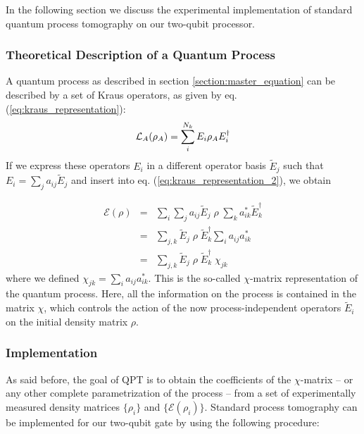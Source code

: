 \smallskip

In the following section we discuss the experimental implementation of standard quantum process tomography on our two-qubit processor.

\subsubsection{Theoretical Description of a Quantum Process}

A quantum process as described in section \ref{section:master_equation} can be described by a set of Kraus operators, as given by eq. (\ref{eq:kraus_representation}):
%
\begin{equation}
\LA{A}(\rho_A) = \sum\limits_i^{N_k} E_i \rho_A E_i^\dagger \label{eq:kraus_representation_2}
\end{equation}
%
If we express these operators $E_i$ in a different operator basis $\tilde{E}_j$ such that $E_i = \sum_j a_{ij} \tilde{E}_{j}$ and insert into eq. (\ref{eq:kraus_representation_2}), we obtain

\begin{eqnarray}
 \mathcal{E}(\rho) & = & \sum\limits_i \sum\limits_j a_{ij} \tilde{E}_j \;\rho\; \sum\limits_k a_{ik}^* \tilde{E}_k^\dagger \\
& = & \sum\limits_{j,k}\tilde{E}_j \; \rho \; \tilde{E}_k^\dagger \sum\limits_i a_{ij} a_{ik}^* \\
& = & \sum\limits_{j,k}\tilde{E}_j \; \rho \; \tilde{E}_k^\dagger \; \chi_{jk} \label{eq:process_chi_representation}
\end{eqnarray}
where we defined $\chi_{jk} = \sum\limits_i a_{ij} a_{ik}^*$. This is the so-called $\chi$-matrix representation of the quantum process. Here, all the information on the process is contained in the matrix $\chi$, which controls the action of the now process-independent operators $\tilde{E}_i$ on the initial density matrix $\rho$.

\subsubsection{Implementation}

As said before, the goal of QPT is to obtain the coefficients of the $\chi$-matrix -- or any other complete parametrization of the process -- from a set of experimentally measured density matrices $\{\rho_i\}$ and $\{\mathcal{E}(\rho_i)\}$. Standard process tomography \citep{nielsen_quantum_2000,poyatos_complete_1997} can be implemented for our two-qubit gate by using the following procedure:

